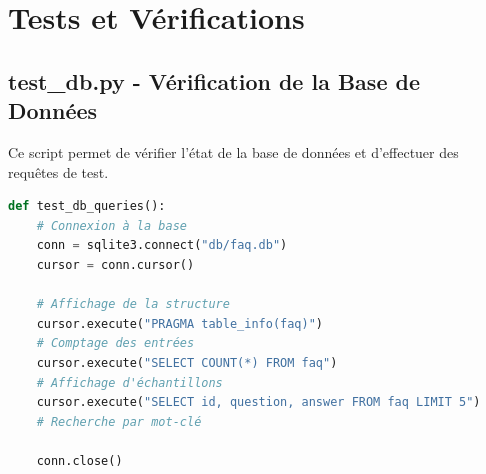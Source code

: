 \documentclass[11pt,a4paper]{article}
\begin{document}
\section{Tests et Vérifications}
\label{sec:tests}

\subsection{test\_db.py - Vérification de la Base de Données}
\label{subsec:test-script}

Ce script permet de vérifier l'état de la base de données et d'effectuer des requêtes de test.

\begin{lstlisting}[language=Python, caption=test\_db.py - Fonctions principales]
def test_db_queries():
    # Connexion à la base
    conn = sqlite3.connect("db/faq.db")
    cursor = conn.cursor()
    
    # Affichage de la structure
    cursor.execute("PRAGMA table_info(faq)")
    # Comptage des entrées
    cursor.execute("SELECT COUNT(*) FROM faq")
    # Affichage d'échantillons
    cursor.execute("SELECT id, question, answer FROM faq LIMIT 5")
    # Recherche par mot-clé
    
    conn.close()
\end{lstlisting}

\end{document}
